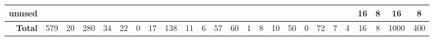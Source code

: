 \begin{table*}[htp!]
\begin{adjustbox}{max width=\textwidth}
\begin{tabular}{r|cc|cc|cc|cc|cc|cc|cc|cc|cc|cc|cc|cc}
             \textbf{unused} &      &      &      &      &      &      &       &      &        &      &      &      &      &      &        &      &       &      &         &      &     16 &    8 &    16 &    8 \\ \hline
                  \textbf{Total} &  579 &   20 &  280 &   34 &   22 &    0 &    17 &  138 &     11 &    6 &   57 &   60 &    1 &    8 &     10 &   50 &     0 &   72 &       7 &    4 &     16 &    8 &  1000 &  400 \\
\end{tabular}

    \end{adjustbox}
        \vspace{-10pt}
\end{table*}